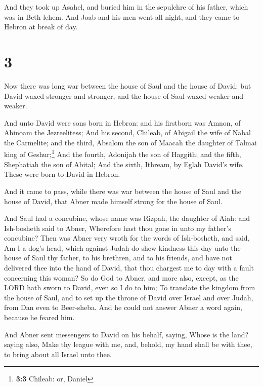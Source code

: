  And they took up Asahel, and buried him in the sepulchre
of his father, which was in Beth-lehem. And Joab and his men went all
night, and they came to Hebron at break of day.

\hypertarget{section-2}{%
\section{3}\label{section-2}}

 Now there was long war between the house of Saul and the
house of David: but David waxed stronger and stronger, and the house of
Saul waxed weaker and weaker.

 And unto David were sons born in Hebron: and his
firstborn was Amnon, of Ahinoam the Jezreelitess;  And his
second, Chileab, of Abigail the wife of Nabal the Carmelite; and the
third, Absalom the son of Maacah the daughter of Talmai king of
Geshur;\footnote{\textbf{3:3} Chileab: or, Daniel}  And
the fourth, Adonijah the son of Haggith; and the fifth, Shephatiah the
son of Abital;  And the sixth, Ithream, by Eglah David's
wife. These were born to David in Hebron.

 And it came to pass, while there was war between the
house of Saul and the house of David, that Abner made himself strong for
the house of Saul.

 And Saul had a concubine, whose name was Rizpah, the
daughter of Aiah: and Ish-bosheth said to Abner, Wherefore hast thou
gone in unto my father's concubine?  Then was Abner very
wroth for the words of Ish-bosheth, and said, Am I a dog's head, which
against Judah do shew kindness this day unto the house of Saul thy
father, to his brethren, and to his friends, and have not delivered thee
into the hand of David, that thou chargest me to day with a fault
concerning this woman?  So do God to Abner, and more also,
except, as the LORD hath sworn to David, even so I do to him;
 To translate the kingdom from the house of Saul, and to
set up the throne of David over Israel and over Judah, from Dan even to
Beer-sheba.  And he could not answer Abner a word again,
because he feared him.

 And Abner sent messengers to David on his behalf,
saying, Whose is the land? saying also, Make thy league with me, and,
behold, my hand shall be with thee, to bring about all Israel unto thee.

